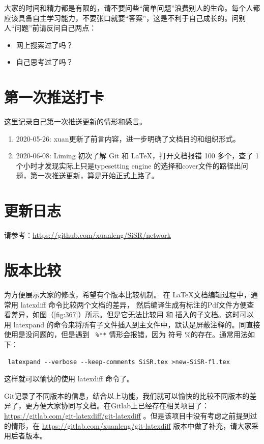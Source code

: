 \documentclass[cn,11pt,chinese,twoside]{elegantbook}
\begin{document}
大家的时间和精力都是有限的，请不要问些“简单问题”浪费别人的生命。每个人都应该具备自主学习能力，不要张口就要“答案”，这是不利于自己成长的。问别人“问题”前请反问自己两点：
\begin{itemize}
\item 网上搜索过了吗？
\item 自己思考过了吗？
\end{itemize}


\section*{第一次推送打卡}
这里记录自己第一次推送更新的情形和感言。
\begin{enumerate}
\item 2020-05-26: xuan更新了前言内容，进一步明确了文档目的和组织形式。
\item 2020-06-08: Liming 初次了解 Git 和 \LaTeX{}，打开文档报错 100 多个，查了 1 个小时才发现实际上只是typesetting engine 的选择和cover文件的路径出问题，第一次推送更新，算是开始正式上路了。
\end{enumerate}


\section*{更新日志}
请参考：\url{https://github.com/xuanleng/SiSR/network}


\section*{版本比较}
为方便展示大家的修改，希望有个版本比较机制。 在 \LaTeX 文档编辑过程中，通常用 latexdiff  命令比较两个文档的差异， 然后编译生成有标注的Pdf文件方便查看差异，如图（\ref{fig:367}）所示。但是它无法比较用 \verb|| 和 \verb|| 插入的子文档。这时可以用 latexpand 的命令来将所有子文件插入到主文件中，默认是屏蔽注释的。同直接使用是没问题的，但是遇到 \verb| %**|
 情形会报错，因为 符号 \%的存在。通常用法如下：
\begin{verbatim}
 latexpand --verbose --keep-comments SiSR.tex >new-SiSR-fl.tex
\end{verbatim}
这样就可以愉快的使用 latexdiff 命令了。

Git记录了不同版本的信息，结合以上功能，我们就可以愉快的比较不同版本的差异了，更方便大家协同写文档。在Gitlab上已经存在相关项目了：
\url{https://gitlab.com/git-latexdiff/git-latexdiff} 。但是该项目中没有考虑之前提到过的情形，在 
\url{https://gitlab.com/xuanleng/git-latexdiff} 版本中做了补充，请大家采用后者版本。
\end{document}
